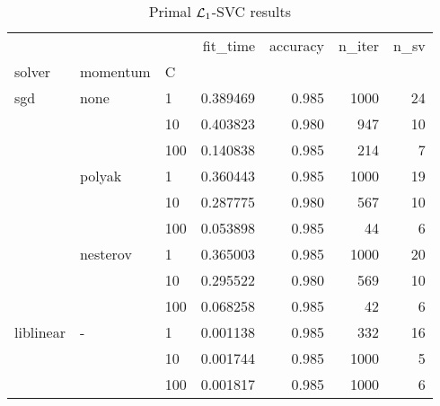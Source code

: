 \begin{table}[H]
\centering
\caption{Primal $\protect \mathcal{L}_1$-SVC results}
\label{primal_l1_svc_cv_results}
\begin{tabular}{lllrrrr}
\toprule
          &   &     &  fit\_time &  accuracy &  n\_iter &  n\_sv \\
solver & momentum & C &           &           &         &       \\
\midrule
sgd & none & 1   &  0.389469 &     0.985 &    1000 &    24 \\
          &   & 10  &  0.403823 &     0.980 &     947 &    10 \\
          &   & 100 &  0.140838 &     0.985 &     214 &     7 \\
          & polyak & 1   &  0.360443 &     0.985 &    1000 &    19 \\
          &   & 10  &  0.287775 &     0.980 &     567 &    10 \\
          &   & 100 &  0.053898 &     0.985 &      44 &     6 \\
          & nesterov & 1   &  0.365003 &     0.985 &    1000 &    20 \\
          &   & 10  &  0.295522 &     0.980 &     569 &    10 \\
          &   & 100 &  0.068258 &     0.985 &      42 &     6 \\
liblinear & - & 1   &  0.001138 &     0.985 &     332 &    16 \\
          &   & 10  &  0.001744 &     0.985 &    1000 &     5 \\
          &   & 100 &  0.001817 &     0.985 &    1000 &     6 \\
\bottomrule
\end{tabular}
\end{table}
